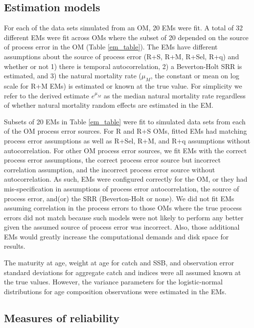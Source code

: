 \documentclass[
  12pt,
]{article}
\begin{document}
\subsection*{Estimation models}\label{estimation-models}

For each of the data sets simulated from an OM, 20 EMs were fit. A total
of 32 different EMs were fit across OMs where the subset of 20 depended
on the source of process error in the OM (Table \ref{em_table}). The EMs
have different assumptions about the source of process error (R+S, R+M,
R+Sel, R+q) and whether or not 1) there is temporal autocorrelation, 2)
a Beverton-Holt SRR is estimated, and 3) the natural mortality rate
(\(\mu_M\), the constant or mean on log scale for R+M EMs) is estimated
or known at the true value. For simplicity we refer to the derived
estimate \(e^{\mu_M}\) as the median natural mortality rate regardless
of whether natural mortality random effects are estimated in the EM.

Subsets of 20 EMs in Table \ref{em_table} were fit to simulated data
sets from each of the OM process error sources. For R and R+S OMs,
fitted EMs had matching process error assumptions as well as R+Sel, R+M,
and R+q assumptions without autocorrelation. For other OM process error
sources, we fit EMs with the correct process error assumptions, the
correct process error source but incorrect correlation assumption, and
the incorrect process error source without autocorrelation. As such, EMs
were configured correctly for the OM, or they had mis-specification in
assumptions of process error autocorrelation, the source of process
error, and(or) the SRR (Beverton-Holt or none). We did not fit EMs
assuming correlation in the process errors to those OMs where the true
process errors did not match because such models were not likely to
perform any better given the assumed source of process error was
incorrect. Also, those additional EMs would greatly increase the
computational demands and disk space for results.

The maturity at age, weight at age for catch and SSB, and observation
error standard deviations for aggregate catch and indices were all
assumed known at the true values. However, the variance parameters for
the logistic-normal distributions for age composition observations were
estimated in the EMs.

\subsection*{Measures of reliability}\label{measures-of-reliability}
\end{document}
